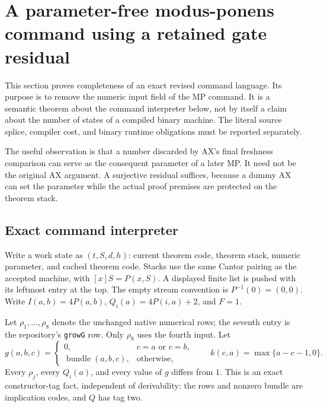 \section{A parameter-free modus-ponens command using a retained gate residual}
\label{sec:residual-parameter}

This section proves completeness of an exact revised command language.  Its
purpose is to remove the numeric input field of the MP command.  It is a
semantic theorem about the command interpreter below, not by itself a claim
about the number of states of a compiled binary machine.  The literal source
splice, compiler cost, and binary runtime obligations must be reported
separately.

The useful observation is that a number discarded by AX's final freshness
comparison can serve as the consequent parameter of a later MP.  It need not
be the original AX argument.  A surjective residual suffices, because a dummy
AX can set the parameter while the actual proof premises are protected on the
theorem stack.

\subsection{Exact command interpreter}

Write a work state as $(t,S,d,h)$: current theorem code, theorem stack,
numeric parameter, and cached theorem code.  Stacks use the same Cantor
pairing as the accepted machine, with $[x]S=P(x,S)$.  A displayed finite list
is pushed with its leftmost entry at the top.  The empty stream convention is
$P^{-1}(0)=(0,0)$.  Write $I(a,b)=4P(a,b)$, $Q_i(a)=4P(i,a)+2$, and
$F=1$.

Let $\rho_1,\ldots,\rho_8$ denote the unchanged native numerical rows;
the seventh entry is the repository's \nolinkurl{growG} row.  Only $\rho_8$
uses the fourth input.  Let
\[
 g(a,b,c)=
 \begin{cases}
  0,&c=a\text{ or }c=b,\\
  \operatorname{bundle}(a,b,c),&\text{otherwise},
 \end{cases}
 \qquad
 k(c,a)=\max\{a-c-1,0\}.
\]
Every $\rho_j$, every $Q_i(a)$, and every value of $g$ differs from $1$.
This is an exact constructor-tag fact, independent of derivability: the
rows and nonzero bundle are implication codes, and $Q$ has tag two.

